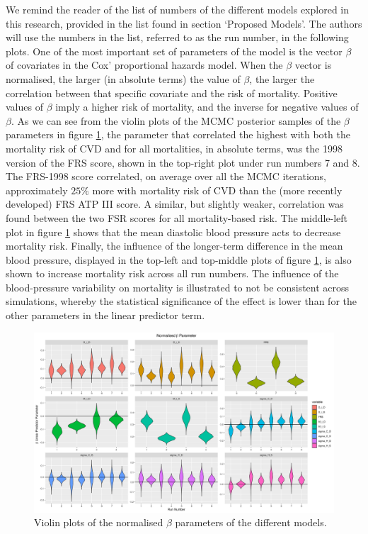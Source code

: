 \documentclass[
]{article}
\begin{document}
We remind the reader of the list of numbers of the different models
explored in this research, provided in the list found in section
`Proposed Models'. The authors will use the numbers in the list,
referred to as the run number, in the following plots. One of the most
important set of parameters of the model is the vector \(\beta\) of
covariates in the Cox' proportional hazards model. When the \(\beta\)
vector is normalised, the larger (in absolute terms) the value of
\(\beta\), the larger the correlation between that specific covariate
and the risk of mortality. Positive values of \(\beta\) imply a higher
risk of mortality, and the inverse for negative values of \(\beta\). As
we can see from the violin plots of the MCMC posterior samples of the
\(\beta\) parameters in figure \ref{fig:betas}, the parameter that
correlated the highest with both the mortality risk of CVD and for all
mortalities, in absolute terms, was the 1998 version of the FRS score,
shown in the top-right plot under run numbers 7 and 8. The FRS-1998
score correlated, on average over all the MCMC iterations, approximately
\(25\%\) more with mortality risk of CVD than the (more recently
developed) FRS ATP III score. A similar, but slightly weaker,
correlation was found between the two FSR scores for all mortality-based
risk. The middle-left plot in figure \ref{fig:betas} shows that the mean
diastolic blood pressure acts to decrease mortality risk. Finally, the
influence of the longer-term difference in the mean blood pressure,
displayed in the top-left and top-middle plots of figure
\ref{fig:betas}, is also shown to increase mortality risk across all run
numbers. The influence of the blood-pressure variability on mortality is
illustrated to not be consistent across simulations, whereby the
statistical significance of the effect is lower than for the other
parameters in the linear predictor term.

\begin{figure}
\hypertarget{fig:betas}{%
\centering
\includegraphics{./Plots/beta/Beta_parameter_normalised.png}
\caption{Violin plots of the normalised \(\beta\) parameters of the
different models.}\label{fig:betas}
}
\end{figure}
\end{document}
